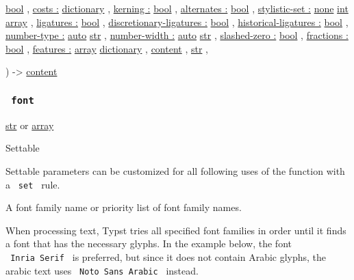 {\href{/docs/reference/foundations/bool/}{bool} , } {
\hyperref[parameters-costs]{costs :}
\href{/docs/reference/foundations/dictionary/}{dictionary} , } {
\hyperref[parameters-kerning]{kerning :}
\href{/docs/reference/foundations/bool/}{bool} , } {
\hyperref[parameters-alternates]{alternates :}
\href{/docs/reference/foundations/bool/}{bool} , } {
\hyperref[parameters-stylistic-set]{stylistic-set :}
\href{/docs/reference/foundations/none/}{none}
\href{/docs/reference/foundations/int/}{int}
\href{/docs/reference/foundations/array/}{array} , } {
\hyperref[parameters-ligatures]{ligatures :}
\href{/docs/reference/foundations/bool/}{bool} , } {
\hyperref[parameters-discretionary-ligatures]{discretionary-ligatures :}
\href{/docs/reference/foundations/bool/}{bool} , } {
\hyperref[parameters-historical-ligatures]{historical-ligatures :}
\href{/docs/reference/foundations/bool/}{bool} , } {
\hyperref[parameters-number-type]{number-type :}
\href{/docs/reference/foundations/auto/}{auto}
\href{/docs/reference/foundations/str/}{str} , } {
\hyperref[parameters-number-width]{number-width :}
\href{/docs/reference/foundations/auto/}{auto}
\href{/docs/reference/foundations/str/}{str} , } {
\hyperref[parameters-slashed-zero]{slashed-zero :}
\href{/docs/reference/foundations/bool/}{bool} , } {
\hyperref[parameters-fractions]{fractions :}
\href{/docs/reference/foundations/bool/}{bool} , } {
\hyperref[parameters-features]{features :}
\href{/docs/reference/foundations/array/}{array}
\href{/docs/reference/foundations/dictionary/}{dictionary} , } {
\href{/docs/reference/foundations/content/}{content} , } {
\href{/docs/reference/foundations/str/}{str} , }

) -\textgreater{} \href{/docs/reference/foundations/content/}{content}

\subsubsection{\texorpdfstring{\texttt{\ font\ }}{ font }}\label{parameters-font}

\href{/docs/reference/foundations/str/}{str} {or}
\href{/docs/reference/foundations/array/}{array}

{{ Settable }}

\label{parameters-font-settable-tooltip}
Settable parameters can be customized for all following uses of the
function with a \texttt{\ set\ } rule.

A font family name or priority list of font family names.

When processing text, Typst tries all specified font families in order
until it finds a font that has the necessary glyphs. In the example
below, the font \texttt{\ Inria\ Serif\ } is preferred, but since it
does not contain Arabic glyphs, the arabic text uses
\texttt{\ Noto\ Sans\ Arabic\ } instead.

